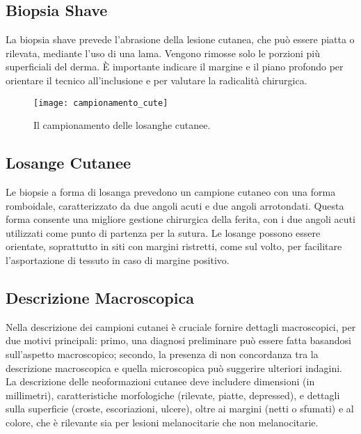 \subsection{Biopsia Shave}
La biopsia shave prevede l'abrasione della lesione cutanea, che può essere piatta o rilevata, mediante l'uso di una lama. Vengono rimosse solo le porzioni più superficiali del derma. È importante indicare il margine e il piano profondo per orientare il tecnico all'inclusione e per valutare la radicalità chirurgica.


\begin{figure}[p]
    \centering
    \texttt{[image: campionamento\_cute]}
    \caption{Il campionamento delle losanghe cutanee.}
    \label{fig:campionamento_cute}
\end{figure}


\subsection{Losange Cutanee}
Le biopsie a forma di losanga prevedono un campione cutaneo con una forma romboidale, caratterizzato da due angoli acuti e due angoli arrotondati. Questa forma consente una migliore gestione chirurgica della ferita, con i due angoli acuti utilizzati come punto di partenza per la sutura. Le losange possono essere orientate, soprattutto in siti con margini ristretti, come sul volto, per facilitare l'asportazione di tessuto in caso di margine positivo.

\subsection{Descrizione Macroscopica}
Nella descrizione dei campioni cutanei è cruciale fornire dettagli macroscopici, per due motivi principali: primo, una diagnosi preliminare può essere fatta basandosi sull'aspetto macroscopico; secondo, la presenza di non concordanza tra la descrizione macroscopica e quella microscopica può suggerire ulteriori indagini. La descrizione delle neoformazioni cutanee deve includere dimensioni (in millimetri), caratteristiche morfologiche (rilevate, piatte, depressed), e dettagli sulla superficie (croste, escoriazioni, ulcere), oltre ai margini (netti o sfumati) e al colore, che è rilevante sia per lesioni melanocitarie che non melanocitarie.
